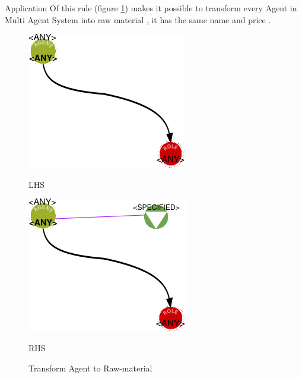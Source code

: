  
Application Of this rule (figure \ref{fig:Generate for each agent raw material}) 
makes it possible to transform  every Agent in Multi Agent System into raw material , it has the same name and price  .
\vspace{1cm}
\begin{figure}[th]
\centering
\begin{minipage}{.6\textwidth}
	\includegraphics[width=.7\linewidth]{Chapiter3/img/L2}
	\linebreak  
	
	\hspace{2.5cm}  LHS 
\end{minipage}%
\begin{minipage}{.6\textwidth}
  \includegraphics[width=.7\linewidth]{Chapiter3/img/R2}
  \linebreak  

  \hspace{2.5cm}  RHS 
\end{minipage}
\caption{\label{fig:Generate for each agent raw material}Transform Agent to Raw-material} 
\end{figure}
\vspace{1cm}

